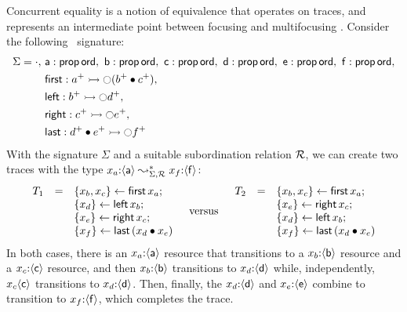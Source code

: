 Concurrent equality is a notion of equivalence that operates on
traces, and represents an intermediate point between focusing and
multifocusing \cite{chaudhuri08canonical}.  Consider the following
\sls~signature:
\begin{align*}
 \Sigma = \cdot, 
~&{\sf a} : {\sf prop}\,{\sf ord},
~ {\sf b} : {\sf prop}\,{\sf ord},
~ {\sf c} : {\sf prop}\,{\sf ord},
~ {\sf d} : {\sf prop}\,{\sf ord},
~ {\sf e} : {\sf prop}\,{\sf ord},
~ {\sf f} : {\sf prop}\,{\sf ord},
\\ & 
  {\sf first}  : a^+ \rightarrowtail {\ocircle}(b^+ \mathbin{\bullet} c^+), 
\\ &
  {\sf left}  : b^+ \rightarrowtail {\ocircle}d^+, ~
\\ &
  {\sf right} : c^+ \rightarrowtail {\ocircle}e^+, ~
\\ &
  {\sf last} : d^+ \mathbin{\bullet} e^+ \rightarrowtail {\ocircle}f^+
\end{align*}
With the signature $\Sigma$ and a suitable subordination relation $\mathcal R$, 
we can create two traces with the type
$x_a{:}\langle {\sf a} \rangle \leadsto^*_{\Sigma,\mathcal R} x_f{:}\langle {\sf f} \rangle$:
\[
\begin{array}{rcl}
T_1 & = 
 & \{{x_b, x_c}\} \leftarrow {\sf first}\,x_a;\\
&& \{{x_d}\} \leftarrow {\sf left}\,x_b;\\
&& \{{x_e}\} \leftarrow {\sf right}\,x_c;\\
&& \{{x_f}\} \leftarrow {\sf last}\,({x_d} \mathbin{\bullet} {x_e})
\end{array}
\quad
\mbox{versus}
\quad
\begin{array}{rcl}
T_2 & = 
 & \{{x_b, x_c}\} \leftarrow {\sf first}\,x_a;\\
&& \{{x_e}\} \leftarrow {\sf right}\,x_c;\\
&& \{{x_d}\} \leftarrow {\sf left}\,x_b;\\
&& \{{x_f}\} \leftarrow {\sf last}\,({x_d} \mathbin{\bullet} {x_e})
\end{array}
\]
In both cases, there is an $x_a{:}\langle {\sf a} \rangle$ resource
that transitions to a $x_b{:}\langle {\sf b} \rangle$ resource and a
$x_c{:}\langle {\sf c} \rangle$ resource, and then $x_b{:}\langle {\sf b} \rangle$
transitions to $x_d{:}\langle {\sf d} \rangle$ while, independently,
$x_c{}\langle {\sf c} \rangle$ transitions to $x_d{:}\langle {\sf d} \rangle$. Then,
finally, the $x_d{:}\langle {\sf d} \rangle$ and $x_e{:}\langle {\sf e} \rangle$ combine to
transition to $x_f{:}\langle {\sf f} \rangle$, which completes the trace. 

